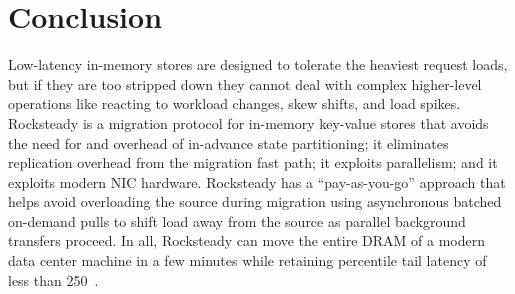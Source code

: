 \section{Conclusion}

Low-latency in-memory stores are designed to tolerate the heaviest request
loads, but if they are too stripped down they cannot deal with complex
higher-level operations like reacting to workload changes, skew shifts, and load spikes.
Rocksteady is a migration protocol for in-memory key-value stores that avoids
the need for and overhead of in-advance state partitioning; it eliminates
replication overhead from the migration fast path; it exploits parallelism; and
it exploits modern NIC hardware.  Rocksteady has a
``pay-as-you-go'' approach that helps avoid overloading the source during migration
using asynchronous batched on-demand pulls to shift load away from the source
as parallel background transfers proceed.  In all, Rocksteady can move the entire DRAM
of a modern data center machine in a few minutes while retaining \nnnth
percentile tail latency of less than 250~\us.
